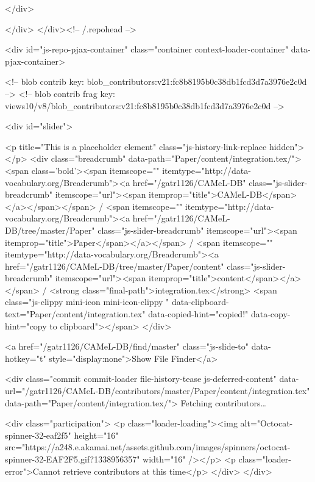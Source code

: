 </div>

  
  
  


            
          </div>
        </div><!-- /.repohead -->

        <div id="js-repo-pjax-container" class="container context-loader-container" data-pjax-container>
          


<!-- blob contrib key: blob_contributors:v21:fc8b8195b0c38db1fcd3d7a3976e2c0d -->
<!-- blob contrib frag key: views10/v8/blob_contributors:v21:fc8b8195b0c38db1fcd3d7a3976e2c0d -->

<div id="slider">


    <p title="This is a placeholder element" class="js-history-link-replace hidden"></p>
    <div class="breadcrumb" data-path="Paper/content/integration.tex/">
      <span class='bold'><span itemscope="" itemtype="http://data-vocabulary.org/Breadcrumb"><a href="/gatr1126/CAMeL-DB" class="js-slider-breadcrumb" itemscope="url"><span itemprop="title">CAMeL-DB</span></a></span></span> / <span itemscope="" itemtype="http://data-vocabulary.org/Breadcrumb"><a href="/gatr1126/CAMeL-DB/tree/master/Paper" class="js-slider-breadcrumb" itemscope="url"><span itemprop="title">Paper</span></a></span> / <span itemscope="" itemtype="http://data-vocabulary.org/Breadcrumb"><a href="/gatr1126/CAMeL-DB/tree/master/Paper/content" class="js-slider-breadcrumb" itemscope="url"><span itemprop="title">content</span></a></span> / <strong class="final-path">integration.tex</strong> <span class="js-clippy mini-icon mini-icon-clippy " data-clipboard-text="Paper/content/integration.tex" data-copied-hint="copied!" data-copy-hint="copy to clipboard"></span>
    </div>

    <a href="/gatr1126/CAMeL-DB/find/master" class="js-slide-to" data-hotkey="t" style="display:none">Show File Finder</a>

      <div class="commit commit-loader file-history-tease js-deferred-content" data-url="/gatr1126/CAMeL-DB/contributors/master/Paper/content/integration.tex" data-path="Paper/content/integration.tex/">
        Fetching contributors…

        <div class="participation">
          <p class="loader-loading"><img alt="Octocat-spinner-32-eaf2f5" height="16" src="https://a248.e.akamai.net/assets.github.com/images/spinners/octocat-spinner-32-EAF2F5.gif?1338956357" width="16" /></p>
          <p class="loader-error">Cannot retrieve contributors at this time</p>
        </div>
      </div>

